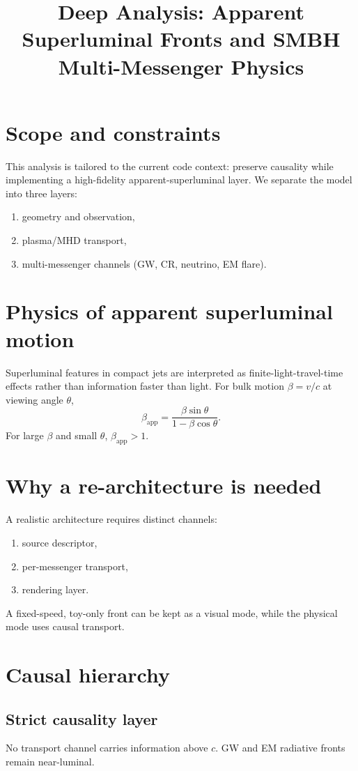 \documentclass[11pt]{article}
\begin{document}
\title{Deep Analysis: Apparent Superluminal Fronts and SMBH Multi-Messenger Physics}
\date{}
\maketitle

\section{Scope and constraints}
This analysis is tailored to the current code context: preserve causality while implementing a high-fidelity apparent-superluminal layer. We separate the model into three layers:
\begin{enumerate}
\item geometry and observation,
\item plasma/MHD transport,
\item multi-messenger channels (GW, CR, neutrino, EM flare).
\end{enumerate}

\section{Physics of apparent superluminal motion}
Superluminal features in compact jets are interpreted as finite-light-travel-time effects rather than information faster than light. For bulk motion $\beta=v/c$ at viewing angle $\theta$,
\[
\beta_{\mathrm{app}} = \frac{\beta \sin\theta}{1-\beta\cos\theta}.
\]
For large $\beta$ and small $\theta$, $\beta_{\mathrm{app}}>1$.

\section{Why a re-architecture is needed}
A realistic architecture requires distinct channels:
\begin{enumerate}
\item source descriptor,\
\item per-messenger transport,\
\item rendering layer.
\end{enumerate}
A fixed-speed, toy-only front can be kept as a visual mode, while the physical mode uses causal transport.

\section{Causal hierarchy}
\subsection{Strict causality layer}
No transport channel carries information above $c$. GW and EM radiative fronts remain near-luminal.
\end{document}
